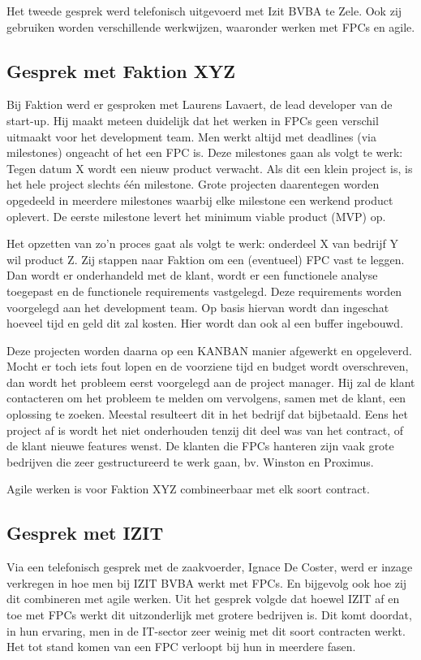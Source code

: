 \documentclass{hogent-article}
\begin{document}
    Het tweede gesprek werd telefonisch uitgevoerd met Izit BVBA te Zele. Ook zij gebruiken worden verschillende werkwijzen, waaronder werken met FPCs en agile.
    
    \subsection{Gesprek met Faktion XYZ}
    Bij Faktion werd er gesproken met Laurens Lavaert, de lead developer van de start-up. Hij maakt meteen duidelijk dat het werken in FPCs geen verschil uitmaakt voor het development team. Men werkt altijd met deadlines (via milestones) ongeacht of het een FPC is. Deze milestones gaan als volgt te werk: Tegen datum X wordt een nieuw product verwacht. Als dit een klein project is, is het hele project slechts één milestone. Grote projecten daarentegen worden opgedeeld in meerdere milestones waarbij elke milestone een werkend product oplevert. De eerste milestone levert het minimum viable product (MVP) op.
    
    Het opzetten van zo'n proces gaat als volgt te werk: onderdeel X van bedrijf Y wil product Z. Zij stappen naar Faktion om een (eventueel) FPC vast te leggen. Dan wordt er onderhandeld met de klant, wordt er een functionele analyse toegepast en de functionele requirements vastgelegd. Deze requirements worden voorgelegd aan het development team. Op basis hiervan wordt dan ingeschat hoeveel tijd en geld dit zal kosten. Hier wordt dan ook al een buffer ingebouwd.
    
    Deze projecten worden daarna op een KANBAN manier afgewerkt en opgeleverd. Mocht er toch iets fout lopen en de voorziene tijd en budget wordt overschreven, dan wordt het probleem eerst voorgelegd aan de project manager. Hij zal de klant contacteren om het probleem te melden om vervolgens, samen met de klant, een oplossing te zoeken. Meestal resulteert dit in het bedrijf dat bijbetaald. Eens het project af is wordt het niet onderhouden tenzij dit deel was van het contract, of de klant nieuwe features wenst. De klanten die FPCs hanteren zijn vaak grote bedrijven die zeer gestructureerd te werk gaan, bv. Winston en Proximus.
    
    Agile werken is voor Faktion XYZ combineerbaar met elk soort contract.
    
    \subsection{Gesprek met IZIT}
    Via een telefonisch gesprek met de zaakvoerder, Ignace De Coster, werd er inzage verkregen in hoe men bij IZIT BVBA werkt met FPCs. En bijgevolg ook hoe zij dit combineren met agile werken. Uit het gesprek volgde dat hoewel IZIT af en toe met FPCs werkt dit uitzonderlijk met grotere bedrijven is. Dit komt doordat, in hun ervaring, men in de IT-sector zeer weinig met dit soort contracten werkt. Het tot stand komen van een FPC verloopt bij hun in meerdere fasen.
    
\end{document}
